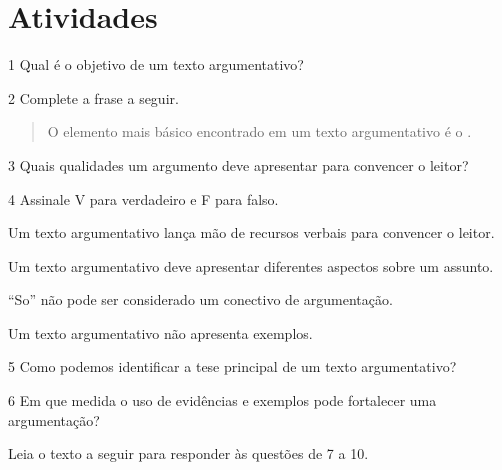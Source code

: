 \section{Atividades}

\num{1} Qual é o objetivo de um texto argumentativo?



\num{2} Complete a frase a seguir.

\begin{quote}
O elemento mais básico encontrado em um texto argumentativo é o .
\end{quote}

\num{3} Quais qualidades um argumento deve apresentar para convencer o leitor?


\num{4} Assinale V para verdadeiro e F para falso.

\begin{boxlist}
 Um texto argumentativo lança mão de recursos verbais para convencer o leitor.

 Um texto argumentativo deve apresentar diferentes aspectos sobre um assunto.

 ``So'' não pode ser considerado um conectivo de argumentação.

 Um texto argumentativo não apresenta exemplos.
\end{boxlist}

\num{5} Como podemos identificar a tese principal de um texto argumentativo?


\num{6} Em que medida o uso de evidências e exemplos pode fortalecer uma argumentação?



Leia o texto a seguir para responder às questões de 7 a 10.

